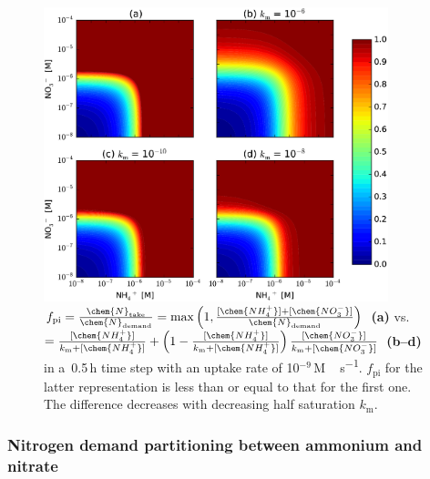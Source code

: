 \documentclass[gmd,noline]{copernicus}
\begin{document}
\begin{figure}[t]
\includegraphics[width=100mm]{gmd-2015-254-f03.png}
\caption{$f_{\text{pi}}=\frac{\chem{N}_\text{take}}{\chem{N}_\text{demand}}=\max\left(1,\frac{[\chem{NH_4^+}]+[\chem{NO_3^-}]}{\chem{N}_\text{demand}}\right)$~\textbf{(a)}
vs.
$=\frac{[\chem{NH_4^+}]}{k_\mathrm{m}+[\chem{NH_4^+}]}+\left(1-\frac{[\chem{NH_4^+}]}{k_\mathrm{m}+[\chem{NH_4^+}]}\right)\frac{[\chem{NO_3^-}]}{k_\mathrm{m}+[\chem{NO_3^-}]}$~\textbf{(b--d)}
in a~0.5\,h time step with an uptake rate of 10$^{-9}$\,\unit{M\,s^{-1}}.
$f_{\text{pi}}$ for the latter representation is less than or equal to that
for the first one. The difference decreases with decreasing half saturation
$k_\mathrm{m}$.} \label{fig:demanddistribution}
\end{figure}


\subsubsection{Nitrogen demand partitioning between ammonium and nitrate}%
\end{document}
